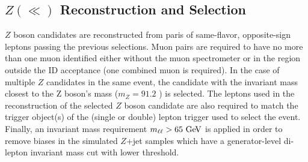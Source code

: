 \subsection{$Z(\ll)$ Reconstruction and Selection}
$Z$ boson candidates are reconstructed from paris of same-flavor, opposite-sign
leptons passing the previous selections. Muon pairs are required to have no more
than one muon identified either without the muon spectrometer or in the region
outside the ID acceptance (one combined muon is required). In the case of
multiple $Z$ candidates in the same event, the candidate with the invariant
mass closest to the Z boson's mass ($m_Z = 91.2$ \cite{Beringer:1900zz}) is selected.
The leptons used in the reconstruction of the selected $Z$ boson candidate are also
required to match the trigger object(s) of the (single or double) lepton trigger
used to select the event. Finally, an invariant mass requirement $\mass\ell > 65 \GeV$
is applied in order to remove biases in the simulated $Z$+jet samples which have a 
generator-level di-lepton invariant mass cut with lower threshold.

